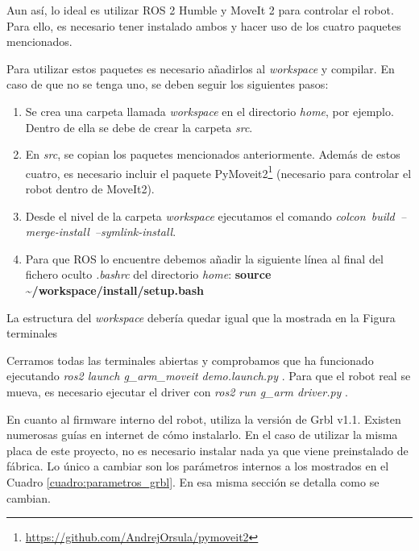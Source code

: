 Aun así, lo ideal es utilizar ROS 2 Humble y MoveIt 2 para controlar el robot. Para ello, es necesario tener instalado 
ambos y hacer uso de los cuatro paquetes mencionados.

\newpage
Para utilizar estos paquetes es necesario añadirlos al \textit{workspace} y compilar. En caso de que no se tenga uno, 
se deben seguir los siguientes pasos: 
\begin{enumerate}
\item Se crea una carpeta llamada \textit{workspace} en el directorio \textit{home}, por ejemplo. Dentro de ella 
se debe de crear la carpeta \textit{src}. 
\item En \textit{src}, se copian los paquetes mencionados anteriormente. Además de estos cuatro, es necesario incluir el paquete 
PyMoveit2\footnote{\url{https://github.com/AndrejOrsula/pymoveit2}} (necesario para controlar el robot dentro de MoveIt2).
\item Desde el nivel de la carpeta \textit{workspace} ejecutamos el comando \mbox{\textit{colcon build --merge-install --symlink-install}}.
\item Para que ROS lo encuentre debemos añadir la siguiente línea al final del fichero oculto \textit{.bashrc} del directorio \textit{home}:
\textbf{source \textasciitilde/workspace/install/setup.bash}

\end{enumerate}

La estructura del \textit{workspace} debería quedar igual que la mostrada en la Figura terminales

Cerramos todas las terminales abiertas y comprobamos que ha funcionado ejecutando \textit{ros2 launch g\_arm\_moveit demo.launch.py} . Para que el 
robot real se mueva, es necesario ejecutar el driver con \textit{ros2 run g\_arm driver.py} .


En cuanto al firmware interno del robot, utiliza la versión de Grbl v1.1. Existen numerosas guías en internet de 
cómo instalarlo. En el caso de utilizar la misma placa de este proyecto, no es necesario instalar nada ya que viene preinstalado de fábrica. Lo único 
a cambiar son los parámetros internos a los mostrados en el Cuadro \ref{cuadro:parametros_grbl}. En esa misma sección se detalla como se cambian.

